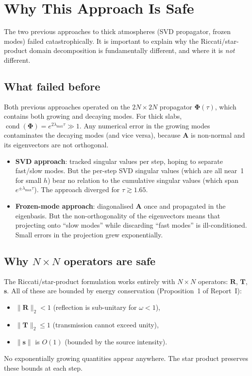 \documentclass[11pt,a4paper]{article}
\newcommand{\cond}{\operatorname{cond}}
\newcommand{\vect}[1]{\bm{#1}}
\newcommand{\mat}[1]{\mathbf{#1}}
\theoremstyle{definition}
\begin{document}
\section{Why This Approach Is Safe}\label{sec:safety}

The two previous approaches to thick atmospheres (SVD propagator,
frozen modes) failed catastrophically.  It is important to explain
why the Riccati/star-product domain decomposition is fundamentally
different, and where it is \emph{not} different.

\subsection{What failed before}

Both previous approaches operated on the $2N\!\times\!2N$ propagator
$\mat{\Phi}(\tau)$, which contains both growing and decaying modes.
For thick slabs, $\cond(\mat{\Phi})=e^{2\lambda_{\max}\tau}\gg 1$.
Any numerical error in the growing modes contaminates the decaying
modes (and vice versa), because $\mat{A}$ is non-normal and its
eigenvectors are not orthogonal.

\begin{itemize}[nosep]
\item \textbf{SVD approach}: tracked singular values per step, hoping
  to separate fast/slow modes.  But the per-step SVD singular values
  (which are all near~1 for small $h$) bear no relation to the
  cumulative singular values (which span $e^{\pm\lambda_{\max}\tau}$).
  The approach diverged for $\tau\gtrsim 1.65$.
\item \textbf{Frozen-mode approach}: diagonalised $\mat{A}$ once and
  propagated in the eigenbasis.  But the non-orthogonality of the
  eigenvectors means that projecting onto ``slow modes'' while
  discarding ``fast modes'' is ill-conditioned.  Small errors in the
  projection grew exponentially.
\end{itemize}

\subsection{Why $N\!\times\!N$ operators are safe}

The Riccati/star-product formulation works entirely with $N\!\times\!N$
operators: $\mat{R}$, $\mat{T}$, $\vect{s}$.  All of these are
bounded by energy conservation (Proposition~1 of Report~I):
\begin{itemize}[nosep]
\item $\|\mat{R}\|_2 < 1$ (reflection is sub-unitary for $\omega<1$),
\item $\|\mat{T}\|_2 \leq 1$ (transmission cannot exceed unity),
\item $\|\vect{s}\|$ is $O(1)$ (bounded by the source intensity).
\end{itemize}
No exponentially growing quantities appear anywhere.  The star product
preserves these bounds at each step.
\end{document}
